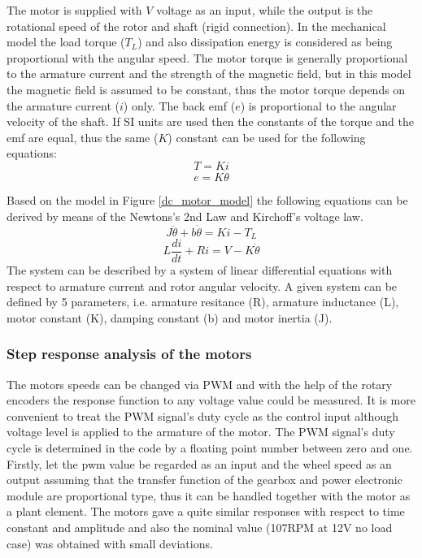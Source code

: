 \documentclass[12pt,english,twoside]{article}
\begin{document}
The motor is supplied with $V$ voltage as an input, while the output is the rotational speed of the rotor and shaft (rigid connection). In the mechanical model the load torque ($T_L$) and also dissipation energy is considered as being proportional with the angular speed. The motor torque is generally proportional to the armature current and the strength of the magnetic field, but in this model the magnetic field is assumed to be constant, thus the motor torque depends on the armature current ($i$) only. The back emf ($e$) is proportional to the angular velocity of the shaft. If SI units are used then the constants of the torque and the emf are equal, thus the same ($K$) constant can be used for the following equations:\cite{dc_motor_3}\cite{dc_motor_4}
\begin{equation}
T = K i
\end{equation}
\begin{equation}
e = K \dot \theta
\end{equation}		

Based on the model in Figure \ref{dc_motor_model} the following equations can be derived by means of the Newtons's 2nd Law and Kirchoff's voltage law.
\begin{equation}
J \ddot \theta + b \dot \theta = K i - T_L
\label{dc_eq_1}
\end{equation}
\begin{equation}
L \frac{di}{dt} + R i = V - K \dot \theta
\label{dc_eq_2}
\end{equation}
The system can be described by a system of linear differential equations with respect to armature current and rotor angular velocity. A given system can be defined by 5 parameters, i.e. armature resitance (R), armature inductance (L), motor constant (K), damping constant (b) and motor inertia (J).
\subsubsection{Step response analysis of the motors}
The motors speeds can be changed via PWM and with the help of the rotary encoders the response function to any voltage value could be measured. It is more convenient to treat the PWM signal's duty cycle as the control input although voltage level is applied to the armature of the motor. The PWM signal's duty cycle is determined in the code by a floating point number between zero and one. Firstly, let the pwm value be regarded as an input and the wheel speed as an output assuming that the transfer function of the gearbox and power electronic module are proportional type, thus it can be handled together with the motor as a plant element. 
The motors gave a quite similar responses with respect to time constant and amplitude and also the nominal value (107RPM at 12V no load case) was obtained with small deviations. 
\end{document}
